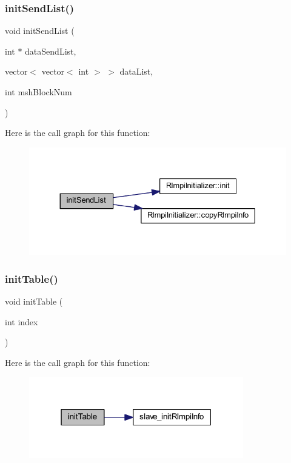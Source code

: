 \subsubsection{\texorpdfstring{initSendList()}{initSendList()}\hspace{0.1cm}{\footnotesize\ttfamily [2/2]}}
{\footnotesize\ttfamily void init\+Send\+List (\begin{DoxyParamCaption}\item[{int $\ast$}]{data\+Send\+List,  }\item[{vector$<$ vector$<$ int $>$ $>$}]{data\+List,  }\item[{int}]{msh\+Block\+Num }\end{DoxyParamCaption})}

Here is the call graph for this function\+:
\nopagebreak
\begin{figure}[H]
\begin{center}
\leavevmode
\includegraphics[width=330pt]{tools_2RL__MPI_2register_8H_ace23239002b4fdf135d4ad20ae2df6e7_cgraph}
\end{center}
\end{figure}
\mbox{\label{tools_2RL__MPI_2register_8H_a14fad51cfceca5a582218c98bdb3d769}} 
\subsubsection{\texorpdfstring{initTable()}{initTable()}}
{\footnotesize\ttfamily void init\+Table (\begin{DoxyParamCaption}\item[{int}]{index }\end{DoxyParamCaption})}

Here is the call graph for this function\+:
\nopagebreak
\begin{figure}[H]
\begin{center}
\leavevmode
\includegraphics[width=265pt]{tools_2RL__MPI_2register_8H_a14fad51cfceca5a582218c98bdb3d769_cgraph}
\end{center}
\end{figure}


